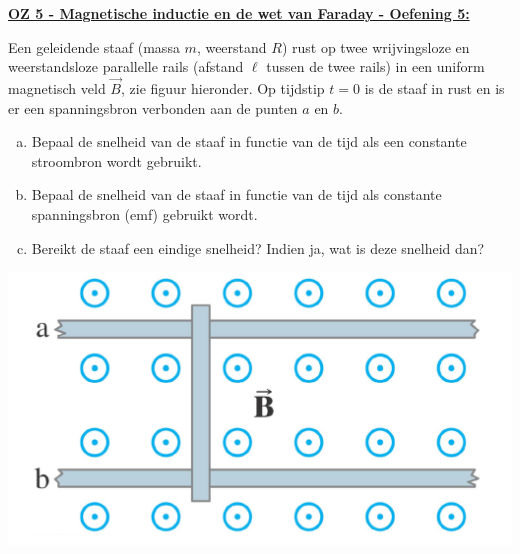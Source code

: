 \textbf{\underline{OZ 5 - Magnetische inductie en de wet van Faraday - Oefening 5:}}
\vspace{0.5cm}

Een geleidende staaf (massa $m$, weerstand $R$) rust op twee wrijvingsloze en weerstandsloze parallelle rails (afstand $\ell$ tussen de twee rails) in een uniform magnetisch veld $\Vec{B}$, zie figuur hieronder. Op tijdstip $t = 0$ is de staaf in rust en is er een spanningsbron verbonden aan de punten $a$ en $b$. 

\begin{enumerate}[(a)]
    \item 
        Bepaal de snelheid van de staaf in functie van de tijd als een constante stroombron wordt gebruikt.
    \item 
        Bepaal de snelheid van de staaf in functie van de tijd als constante spanningsbron (emf) gebruikt wordt.
    \item 
        Bereikt de staaf een eindige snelheid? Indien ja, wat is deze snelheid dan?
\end{enumerate}

\begin{center}
    \includegraphics[scale = 0.35]{oz05/resources/Oz5Oef5.png}
\end{center}

